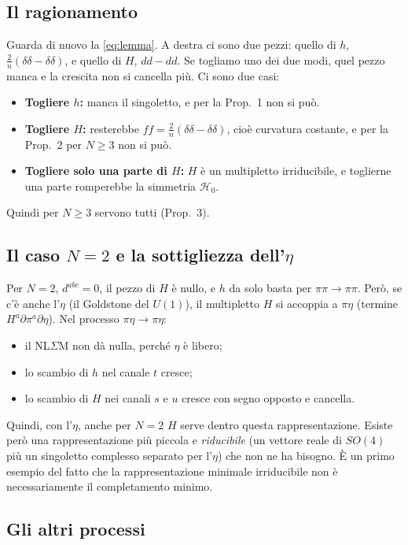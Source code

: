 \documentclass[11pt,a4paper]{article}
\numberwithin{equation}{section}
\theoremstyle{remark}
\newcommand{\Hg}{\mathcal{H}_0}
\begin{document}
\subsection{Il ragionamento}

Guarda di nuovo la \eqref{eq:lemma}. A destra ci sono due pezzi: quello di $h$, $\frac2n(\delta\delta-\delta\delta)$, e quello di $H$, $dd-dd$. Se togliamo uno dei due modi, quel pezzo manca e la crescita non si cancella più. Ci sono due casi:
\begin{itemize}
\item \textbf{Togliere $h$:} manca il singoletto, e per la Prop.~1 non si può.
\item \textbf{Togliere $H$:} resterebbe $f f=\frac2n(\delta\delta-\delta\delta)$, cioè curvatura costante, e per la Prop.~2 per $N\ge3$ non si può.
\item \textbf{Togliere solo una parte di $H$:} $H$ è un multipletto irriducibile, e toglierne una parte romperebbe la simmetria $\Hg$.
\end{itemize}
Quindi per $N\ge3$ servono tutti (Prop.~3).

\subsection{Il caso $N=2$ e la sottigliezza dell'$\eta$}

Per $N=2$, $d^{abc}=0$, il pezzo di $H$ è nullo, e $h$ da solo basta per $\pi\pi\to\pi\pi$. Però, se c'è anche l'$\eta$ (il Goldstone del $U(1)$), il multipletto $H$ si accoppia a $\pi\eta$ (termine $H^a\partial\pi^a\partial\eta$). Nel processo $\pi\eta\to\pi\eta$:
\begin{itemize}[nosep]
\item il NL$\Sigma$M non dà nulla, perché $\eta$ è libero;
\item lo scambio di $h$ nel canale $t$ cresce;
\item lo scambio di $H$ nei canali $s$ e $u$ cresce con segno opposto e cancella.
\end{itemize}
Quindi, con l'$\eta$, anche per $N=2$ $H$ serve dentro questa rappresentazione. Esiste però una rappresentazione più piccola e \emph{riducibile} (un vettore reale di $SO(4)$ più un singoletto complesso separato per l'$\eta$) che non ne ha bisogno. È un primo esempio del fatto che la rappresentazione minimale irriducibile non è necessariamente il completamento minimo.

\subsection{Gli altri processi}
\end{document}
